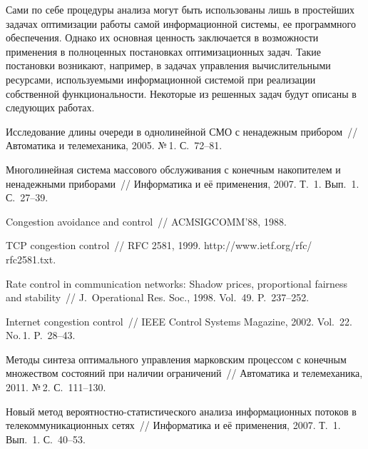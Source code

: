 \begin{multicols}{2}
  Сами по себе процедуры анализа могут быть использованы лишь в простейших задачах 
оптимизации работы самой информационной сис\-те\-мы, ее программного обеспечения. 
Однако их основная ценность заключается в возможности применения\linebreak
в полноценных 
постановках оптимизационных задач. Такие постановки возникают, например, в задачах 
управления вычислительными ресурсами, исполь\-зу\-емы\-ми информационной сис\-те\-мой при 
реализации собственной функциональности. Некоторые из решенных задач будут описаны в 
следующих работах.

\vspace*{-6pt}

{\small\frenchspacing
{%
\begin{thebibliography}{99}

Исследование длины очереди в однолинейной СМО с ненадежным прибором~// Автоматика 
и телемеханика, 2005. №\,1. С.~72--81.

Многолинейная сис\-те\-ма массового обслуживания с конечным накопителем и ненадежными 
приборами~// Информатика и её применения, 2007. Т.~1. Вып.~1. С.~27--39.

Congestion avoidance and control~// \mbox{ACMSIGCOMM'88}, 1988.

TCP congestion control~// RFC 2581, 1999. {\sf http://www.ietf.org/rfc/ rfc2581.txt}.

Rate control in communication networks: Shadow prices, proportional fairness and stability~// 
J.~Operational Res. Soc., 1998. Vol.~49. P.~237--252.

Internet congestion control~// IEEE Control Systems Magazine, 2002. Vol.~22. No.\,1. P.~28--43.

Методы синтеза оптимального управления марковским процессом с конечным множеством 
состояний при наличии ограничений~// Автоматика и телемеханика, 2011. №\,2. С.~111--130.

Новый метод вероятностно-статистического анализа информационных потоков в 
телекоммуникационных сетях~// Информатика и её применения, 2007. Т.~1. Вып.~1. 
С.~40--53.


\end{thebibliography}}}
\end{multicols}
